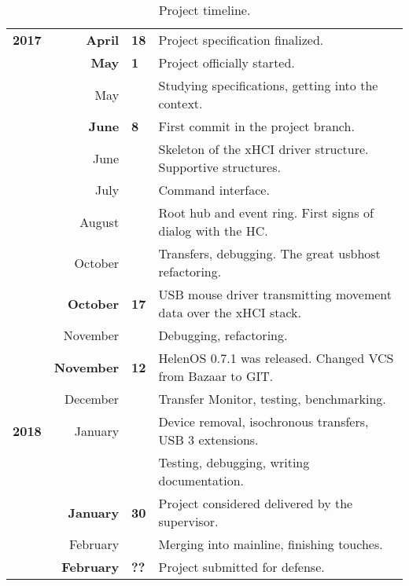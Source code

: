 \begin{table}[h]
	\centering
	{\renewcommand{\arraystretch}{1.2}
	\newcommand{\hl}{\rowcolor[gray]{0.95}}
	\begin{tabular*}{0.95\textwidth}{rr@{\hspace{\tabcolsep}}l|l}
	\hline \hl \textbf{2017}
	    & \textbf{April}    & \textbf{18} & Project specification finalized. \\
	\hl & \textbf{May}      & \textbf{1}  & Project officially started. \\
	    & May               &             & Studying specifications, getting into the context. \\
	\hl & \textbf{June}     & \textbf{8}  & First commit in the project branch. \\
	    & June              &             & Skeleton of the xHCI driver structure. Supportive structures. \\
	    & July              &             & Command interface. \\
	    & August            &             & Root hub and event ring. First signs of dialog with the HC. \\
	    & October           &             & Transfers, debugging. The great usbhost refactoring. \\
	\hl & \textbf{October}  & \textbf{17} & USB mouse driver transmitting movement data over the xHCI stack. \\
	    & November          &             & Debugging, refactoring.  \\
	\hl & \textbf{November} & \textbf{12} & HelenOS 0.7.1 was released. Changed VCS from Bazaar to GIT. \\
	    & December          &             & Transfer Monitor, testing, benchmarking. \\
	\hline \textbf{2018}
	    & January           &             & Device removal, isochronous transfers, USB 3 extensions. \\
	    &                   &             & Testing, debugging, writing documentation. \\
	\hl & \textbf{January}  & \textbf{30} & Project considered delivered by the supervisor. \\
	    & February          &             & Merging into mainline, finishing touches. \\
	\hl & \textbf{February} & \textbf{??} & Project submitted for defense. \\
	\hline
	\end{tabular*}
	}
	\caption{Project timeline.}
	\label{tbl:timeline}
\end{table}

